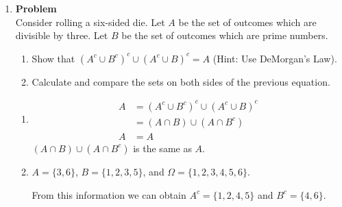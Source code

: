 \documentclass[12pt]{article}
\newenvironment{Ex}{\textbf{Problem}\vspace{.75em}\\}{}
\begin{document}
\begin{enumerate}
\begin{Ex}
\begin{enumerate}
    \end{enumerate}
    \begin{solution} \hfill
      \begin{enumerate}
      \item $P(A \cup B) = 0.8$
      \item $P(A^c \cup B^c) = 0.3$
      \end{enumerate}
    \end{solution}
  \end{Ex}
\item 
  \begin{Ex}
    Consider rolling a six-sided die. Let $A$ be the set of outcomes
    which are divisible by three. Let $B$ be the set of outcomes which
    are prime numbers.
    \begin{enumerate}
    \item Show that $(A^c \cup B^c)^c \cup (A^c \cup B)^c=A$ (Hint:
      Use DeMorgan's Law).
    \item Calculate and compare the sets on both sides of the previous
      equation.
    \end{enumerate}
    \begin{solution} \hfill
      \begin{enumerate}
      \item
        \begin{equation*}
          \begin{aligned}
             A &= (A^c \cup B^c)^c \cup (A^c \cup B)^c \\
             &= (A \cap B) \cup (A \cap B^c) \\
             A &= A
          \end{aligned}
        \end{equation*}
        $(A \cap B) \cup (A \cap B^c)$ is the same as $A$.
      \item $A = \{3,6\}$, $B = \{1,2,3,5\}$, and $\Omega = \{1,2,3,4,5,6\}$.

        From this information we can obtain $A^c = \{1,2,4,5\}$ and
        $B^c=\{4,6\}$.


\end{enumerate}
\end{solution}
\end{Ex}
\end{enumerate}
\end{document}
